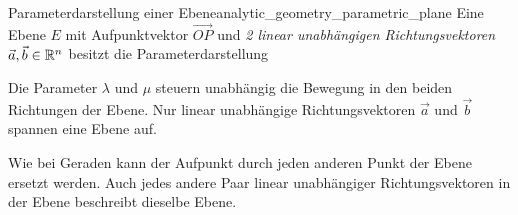 \begin{DefinitionBox}{Parameterdarstellung einer Ebene}{analytic_geometry_parametric_plane}
\noindent
Eine Ebene $E$ mit Aufpunktvektor $\overrightarrow{OP}$ und \emph{2
linear unabhängigen Richtungsvektoren} $\vec a,\vec b\in\mathbb{R}^n$ besitzt die
Parameterdarstellung
\par\smallskip
\noindent
\begin{minipage}[t]{0.54\linewidth}
  \vspace{0pt}
  \centering
\end{minipage}\hfill
\begin{minipage}[t]{0.42\linewidth}
  \vspace{0pt}
  \centering
\end{minipage}
\par\smallskip
Die Parameter $\lambda$ und $\mu$ steuern unabhängig die Bewegung in den
beiden Richtungen der Ebene.
Nur linear unabhängige Richtungsvektoren $\vec a$ und $\vec b$ spannen
eine Ebene auf.
\end{DefinitionBox}

Wie bei Geraden kann der Aufpunkt durch jeden anderen Punkt der Ebene ersetzt
werden. Auch jedes andere Paar linear unabhängiger Richtungsvektoren in der
Ebene beschreibt dieselbe Ebene.
